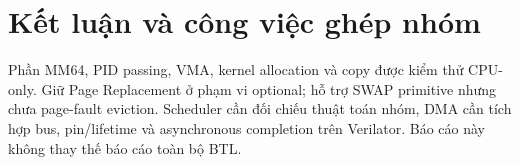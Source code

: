 \documentclass[11pt,a4paper]{article}
\begin{document}
\section{Kết luận và công việc ghép nhóm}
Phần MM64, PID passing, VMA, kernel allocation và copy được kiểm thử CPU-only. Giữ Page Replacement ở phạm vi optional; hỗ trợ SWAP primitive nhưng chưa page-fault eviction. Scheduler cần đối chiếu thuật toán nhóm, DMA cần tích hợp bus, pin/lifetime và asynchronous completion trên Verilator. Báo cáo này không thay thế báo cáo toàn bộ BTL.
\end{document}
